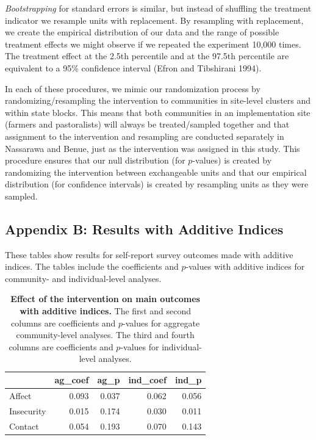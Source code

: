 \documentclass[11pt]{article}
\begin{document}
\emph{Bootstrapping} for standard errors is similar, but instead of
shuffling the treatment indicator we resample units with replacement. By
resampling with replacement, we create the empirical distribution of our
data and the range of possible treatment effects we might observe if we
repeated the experiment 10,000 times. The treatment effect at the 2.5th
percentile and at the 97.5th percentile are equivalent to a 95\%
confidence interval (Efron and Tibshirani 1994).

In each of these procedures, we mimic our randomization process by
randomizing/resampling the intervention to communities in site-level
clusters and within state blocks. This means that both communities in an
implementation site (farmers and pastoralists) will always be
treated/sampled together and that assignment to the intervention and
resampling are conducted separately in Nassarawa and Benue, just as the
intervention was assigned in this study. This procedure ensures that our
null distribution (for \(p\)-values) is created by randomizing the
intervention between exchangeable units and that our empirical
distribution (for confidence intervals) is created by resampling units
as they were sampled.

\hypertarget{appendix-b-results-with-additive-indices}{%
\subsection{Appendix B: Results with Additive
Indices}\label{appendix-b-results-with-additive-indices}}

These tables show results for self-report survey outcomes made with
additive indices. The tables include the coefficients and \(p\)-values
with additive indices for community- and individual-level analyses.

\begin{table}[H]
\begin{center}

\begin{tabular}{l|r|r|r|r}
\hline
  & ag\_coef & ag\_p & ind\_coef & ind\_p\\
\hline
Affect & 0.093 & 0.037 & 0.062 & 0.056\\
\hline
Insecurity & 0.015 & 0.174 & 0.030 & 0.011\\
\hline
Contact & 0.054 & 0.193 & 0.070 & 0.143\\
\hline
\end{tabular}


\caption{\label{tab:add_ind_tab}\textbf{Effect of the intervention on main outcomes with additive indices.} The first and second columns are coefficients and $p$-values for aggregate community-level analyses.  The third and fourth columns are coefficients and $p$-values for individual-level analyses.}
\end{center}
\end{table}
\end{document}

